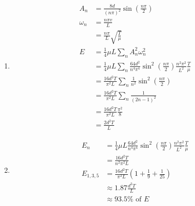 \documentclass{article}
\begin{document}
\begin{enumerate}
  \item

        \begin{align*}
          A_n      & = \frac{8 d}{(n \pi)^2} \sin \left( \frac{n \pi}{2} \right)                                                                   \\
          \omega_n & = \frac{n \pi v}{L}                                                                                                           \\
                   & = \frac{n \pi}{L} \sqrt{\frac{T}{\mu}}                                                                                        \\
          E        & = \frac{1}{4} \mu L \sum_n A_n^2 \omega_n^2                                                                                   \\
                   & = \frac{1}{4} \mu L \sum_n \frac{64 d^2}{n^4 \pi^4} \sin^2 \left( \frac{n \pi}{2} \right) \frac{n^2 \pi^2}{L^2} \frac{T}{\mu} \\
                   & = \frac{16 d^2 T}{\pi^2 L} \sum_n \frac{1}{n^2} \sin^2 \left( \frac{n \pi}{2} \right)                                         \\
                   & = \frac{16 d^2 T}{\pi^2 L} \sum_n \frac{1}{(2 n - 1)^2}                                                                       \\
                   & = \frac{16 d^2 T}{\pi^2 L} \frac{\pi^2}{8}                                                                                    \\
                   & = \frac{2 d^2 T}{L}
        \end{align*}

  \item

        \begin{align*}
          E_n       & = \frac{1}{4} \mu L \frac{64 d^2}{n^4 \pi^4} \sin^2 \left( \frac{n \pi}{2} \right) \frac{n^2 \pi^2}{L^2} \frac{T}{\mu} \\
                    & = \frac{16 d^2 T}{n^2 \pi^2 L}                                                                                         \\
          E_{1,3,5} & = \frac{16 d^2 T}{\pi^2 L} \left( 1 + \frac{1}{9} + \frac{1}{25} \right)                                               \\
                    & \approx 1.87 \frac{d^2 T}{L}                                                                                           \\
                    & \approx 93.5\% \text{ of } E
        \end{align*}
\end{enumerate}
\end{document}
